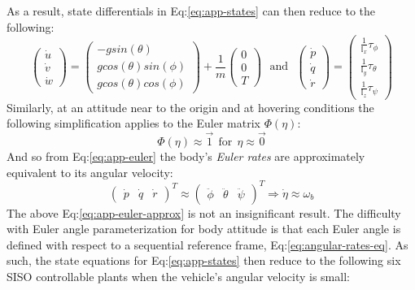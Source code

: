 As a result, state differentials in Eq:\ref{eq:app-states} can then reduce to the following:
\begin{equation}
\begin{pmatrix}
\dot{u}\\
\dot{v}\\
\dot{w}
\end{pmatrix}
=
\begin{pmatrix}
-g sin(\theta)\\
g cos(\theta)sin(\phi)\\
g cos(\theta)cos(\phi)
\end{pmatrix}
+
\frac{1}{m}\begin{pmatrix}
0\\
0\\
T
\end{pmatrix}
~~~\text{and}~~~
\begin{pmatrix}
\dot{p}\\
\dot{q}\\
\dot{r}
\end{pmatrix}
=
\begin{pmatrix}
\frac{1}{\mathbb{I}_x}\tau_\phi\\
\frac{1}{\mathbb{I}_y}\tau_\theta\\
\frac{1}{\mathbb{I}_z}\tau_\psi
\end{pmatrix}
\end{equation}
Similarly, at an attitude near to the origin and at hovering conditions the following simplification applies to the Euler matrix $\Phi(\eta)$:
\begin{equation}
\Phi(\eta)\approx\vec{1}~~\text{for}~~\eta\approx\vec{0}
\end{equation}
And so from Eq:\ref{eq:app-euler} the body's \emph{Euler rates} are approximately equivalent to its angular velocity:
\begin{equation}\label{eq:app-euler-approx}
\begin{pmatrix}\dot{p}&\dot{q}&\dot{r}\end{pmatrix}^T\approx\begin{pmatrix}\ddot{\phi}&\ddot{\theta}&\ddot{\psi}\end{pmatrix}^T
\Rightarrow
\dot{\eta}\approx\omega_b
\end{equation}
The above Eq:\ref{eq:app-euler-approx} is not an insignificant result. The difficulty with Euler angle parameterization for body attitude is that each Euler angle is defined with respect to a sequential reference frame, Eq:\ref{eq:angular-rates-eq}. As such, the state equations for Eq:\ref{eq:app-states} then reduce to the following six SISO controllable plants when the vehicle's angular velocity is small:
